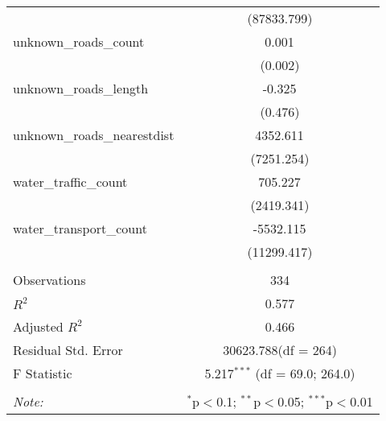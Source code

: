 \begin{table}[!htbp]
\begin{tabular}{@{\extracolsep{5pt}}lc}
  & (87833.799) \\
 unknown_roads_count & 0.001$^{}$ \\
  & (0.002) \\
 unknown_roads_length & -0.325$^{}$ \\
  & (0.476) \\
 unknown_roads_nearestdist & 4352.611$^{}$ \\
  & (7251.254) \\
 water_traffic_count & 705.227$^{}$ \\
  & (2419.341) \\
 water_transport_count & -5532.115$^{}$ \\
  & (11299.417) \\
\hline \\[-1.8ex]
 Observations & 334 \\
 $R^2$ & 0.577 \\
 Adjusted $R^2$ & 0.466 \\
 Residual Std. Error & 30623.788(df = 264)  \\
 F Statistic & 5.217$^{***}$ (df = 69.0; 264.0) \\
\hline
\hline \\[-1.8ex]
\textit{Note:} & \multicolumn{1}{r}{$^{*}$p$<$0.1; $^{**}$p$<$0.05; $^{***}$p$<$0.01} \\
\end{tabular}
\end{table}